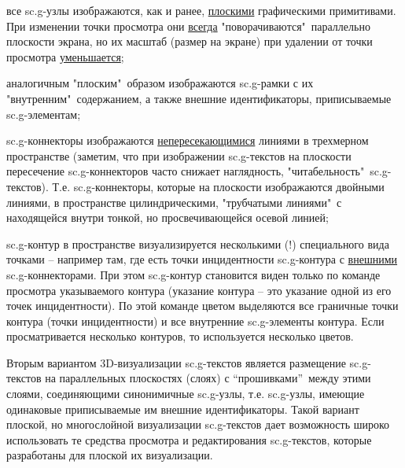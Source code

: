 \begin{SCn}
{\begin{scnitemize}
\item все sc.g-узлы изображаются, как и ранее, \uline{плоскими} графическими примитивами. При изменении точки просмотра они \uline{всегда} "поворачиваются"\ параллельно плоскости экрана, но их масштаб (размер на экране) при удалении от  точки просмотра \uline{уменьшается};
\item аналогичным "плоским"\ образом изображаются sc.g-рамки с их "внутренним"\ содержанием, а также внешние идентификаторы, приписываемые sc.g-элементам;
\item sc.g-коннекторы изображаются \uline{непересекающимися} линиями в трехмерном пространстве (заметим, что при изображении sc.g-текстов на плоскости пересечение sc.g-коннекторов часто снижает наглядность, "читабельность"\ sc.g-текстов). Т.е. sc.g-коннекторы, которые на плоскости изображаются двойными линиями, в пространстве  цилиндрическими, "трубчатыми линиями"\ с находящейся внутри тонкой, но просвечивающейся осевой линией;
\item sc.g-контур в пространстве визуализируется несколькими (!) специального вида точками -- например там, где есть точки инцидентности sc.g-контура с \uline{внешними} sc.g-коннекторами. При этом sc.g-контур становится виден только по команде просмотра указываемого контура (указание контура – это указание одной из его точек инцидентности). По этой команде цветом выделяются все граничные точки контура (точки инцидентности) и все внутренние sc.g-элементы контура. Если просматривается  несколько контуров, то используется несколько цветов.
\end{scnitemize}

Вторым вариантом 3D-визуализации sc.g-текстов является размещение sc.g-текстов на параллельных плоскостях (слоях) с “прошивками”\ между этими слоями, соединяющими синонимичные sc.g-узлы, т.е. sc.g-узлы, имеющие одинаковые приписываемые им внешние идентификаторы. Такой вариант плоской, но многослойной визуализации sc.g-текстов дает возможность широко использовать те средства просмотра и редактирования sc.g-текстов, которые разработаны для плоской их визуализации.}

\bigskip
\scnendstruct {}

\bigskip
\scnendstruct \scnendcurrentsectioncomment

\end{SCn}
